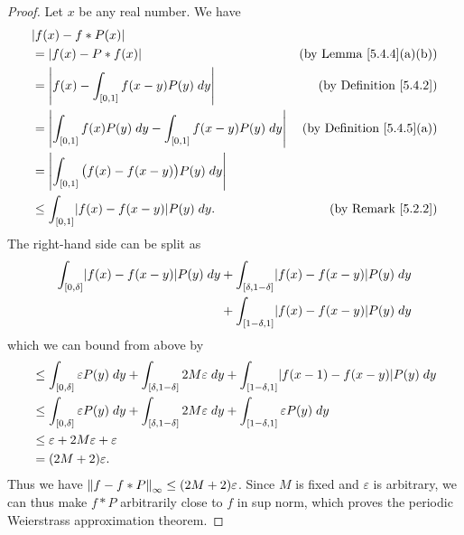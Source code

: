 \begin{proof}
    Let \(x\) be any real number.
    We have
    \begin{align*}
         & \abs{f(x) - f * P(x)}                                                                                             \\
         & = \abs{f(x) - P * f(x)}                                                   & \text{(by Lemma \ref{5.4.4}(a)(b))}   \\
         & = \abs{f(x) - \int_{[0, 1]} f(x - y) P(y) \; dy}                          & \text{(by Definition \ref{5.4.2})}    \\
         & = \abs{\int_{[0, 1]} f(x) P(y) \; dy - \int_{[0, 1]} f(x - y) P(y) \; dy} & \text{(by Definition \ref{5.4.5}(a))} \\
         & = \abs{\int_{[0, 1]} \big(f(x) - f(x - y)\big) P(y) \; dy}                                                        \\
         & \leq \int_{[0, 1]} \abs{f(x) - f(x - y)} P(y) \; dy.                      & \text{(by Remark \ref{5.2.2})}
    \end{align*}
    The right-hand side can be split as
    \begin{align*}
        \int_{[0, \delta]} \abs{f(x) - f(x - y)} P(y) \; dy & + \int_{[\delta, 1 - \delta]} \abs{f(x) - f(x - y)} P(y) \; dy \\
                                                            & + \int_{[1 - \delta, 1]} \abs{f(x) - f(x - y)} P(y) \; dy
    \end{align*}
    which we can bound from above by
    \begin{align*}
         & \leq \int_{[0, \delta]} \varepsilon P(y) \; dy + \int_{[\delta, 1 - \delta]} 2 M \varepsilon \; dy + \int_{[1 - \delta, 1]} \abs{f(x - 1) - f(x - y)} P(y) \; dy \\
         & \leq \int_{[0, \delta]} \varepsilon P(y) \; dy + \int_{[\delta, 1 - \delta]} 2 M \varepsilon \; dy + \int_{[1 - \delta, 1]} \varepsilon P(y) \; dy               \\
         & \leq \varepsilon + 2 M \varepsilon + \varepsilon                                                                                                                 \\
         & = (2M + 2) \varepsilon.
    \end{align*}
    Thus we have \(\norm*{f - f * P}_{\infty} \leq (2M + 2) \varepsilon\).
    Since \(M\) is fixed and \(\varepsilon\) is arbitrary, we can thus make \(f * P\) arbitrarily close to \(f\) in sup norm, which proves the periodic Weierstrass approximation theorem.
\end{proof}

